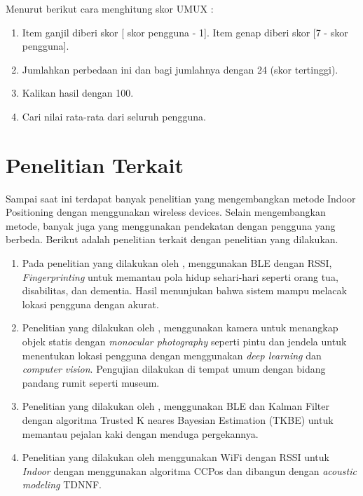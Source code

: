 \par Menurut \citep{finstad2010usability} berikut cara menghitung skor UMUX :

\begin{enumerate}
\item Item ganjil diberi skor [ skor pengguna - 1]. Item genap diberi skor [7 - skor pengguna].

\item Jumlahkan perbedaan ini dan bagi jumlahnya dengan 24 (skor tertinggi).

\item Kalikan hasil dengan 100.

\item Cari nilai rata-rata dari seluruh pengguna.
\end{enumerate}

\newpage
\section{Penelitian Terkait}
Sampai saat ini terdapat banyak penelitian yang mengembangkan metode Indoor Positioning dengan menggunakan wireless devices. Selain mengembangkan metode, banyak juga yang menggunakan pendekatan dengan pengguna yang berbeda. 
Berikut adalah penelitian terkait dengan penelitian yang dilakukan.

\begin{enumerate}
\item Pada penelitian yang dilakukan oleh \citep{bai2020low}, menggunakan BLE dengan RSSI, \textit{Fingerprinting }untuk memantau pola hidup sehari-hari seperti orang tua, disabilitas, dan dementia. Hasil menunjukan bahwa sistem mampu melacak lokasi pengguna dengan akurat.

\item Penelitian yang dilakukan oleh \citep{xiao2018indoor}, menggunakan kamera untuk menangkap objek statis dengan \textit{monocular photography} seperti pintu dan jendela untuk menentukan lokasi pengguna dengan menggunakan  \textit{deep learning} dan \textit{computer vision}. Pengujian dilakukan di tempat umum dengan bidang pandang rumit seperti museum.

\item Penelitian yang dilakukan oleh \citep{yadav2019trusted}, menggunakan BLE dan Kalman Filter dengan algoritma Trusted K neares Bayesian Estimation (TKBE) untuk memantau pejalan kaki dengan menduga pergekannya.

\item Penelitian yang dilakukan oleh \citep{qin2021ccpos} menggunakan WiFi dengan RSSI untuk \textit{Indoor} dengan menggunakan algoritma CCPos dan dibangun dengan \textit{acoustic modeling} TDNNF.
\end{enumerate}

